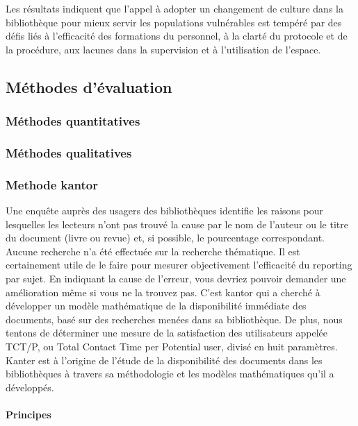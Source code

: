 \documentclass[french,a4paper,12pt]{article}
\begin{document}
{Les résultats indiquent que l'appel à adopter un changement de culture dans la bibliothèque pour mieux servir les populations vulnérables est tempéré par des défis liés à l'efficacité des formations du personnel, à la clarté du protocole et de la procédure, aux lacunes dans la supervision et à l'utilisation de l'espace. 

 

 







\subsection{Méthodes d'évaluation}

\subsubsection{Méthodes quantitatives}


\subsubsection{Méthodes qualitatives}

\subsubsection{Methode kantor }

\quad Une enquête auprès des usagers des bibliothèques identifie les raisons pour lesquelles les lecteurs n'ont pas trouvé la cause par le nom de l'auteur ou le titre du document (livre ou revue) et, si possible, le pourcentage correspondant. Aucune recherche n'a été effectuée sur la recherche thématique.
Il est certainement utile de le faire pour mesurer objectivement l'efficacité du reporting par sujet. En indiquant la cause de l'erreur, vous devriez pouvoir demander une amélioration même si vous ne la trouvez pas. 
\quad C'est kantor qui a cherché à développer un modèle mathématique de la disponibilité immédiate des documents, basé sur des recherches menées dans sa bibliothèque. De plus, nous tentons de déterminer une mesure de la satisfaction des utilisateurs appelée TCT/P, ou Total Contact Time per Potential user, divisé en huit paramètres. Kanter est à l'origine de l'étude de la disponibilité des documents dans les bibliothèques à travers sa méthodologie et les modèles mathématiques qu'il a développés.

 \paragraph{Principes}  
 
}
\end{document}
